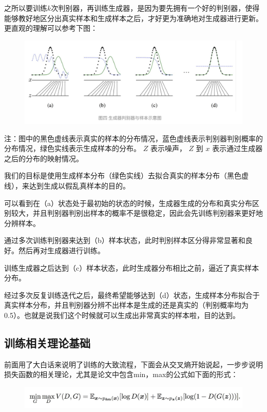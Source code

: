 \documentclass[12pt]{article}
\begin{document}
\begin{framed}
之所以要训练$k$次判别器，再训练生成器，是因为要先拥有一个好的判别器，使得能够教好地区分出真实样本和生成样本之后，才好更为准确地对生成器进行更新。更直观的理解可以参考下图：
\begin{figure}[H]
    \centering
    \includegraphics[width=1\textwidth]{fig/GAN_Generator_Discriminator_Example.png}
\end{figure}

注：图中的黑色虚线表示真实的样本的分布情况，蓝色虚线表示判别器判别概率的分布情况，绿色实线表示生成样本的分布。 $Z$ 表示噪声， $Z$ 到 $x$ 表示通过生成器之后的分布的映射情况。

我们的目标是使用生成样本分布（绿色实线）去拟合真实的样本分布（黑色虚线），来达到生成以假乱真样本的目的。

可以看到在（a）状态处于最初始的状态的时候，生成器生成的分布和真实分布区别较大，并且判别器判别出样本的概率不是很稳定，因此会先训练判别器来更好地分辨样本。

通过多次训练判别器来达到（b）样本状态，此时判别样本区分得非常显著和良好。然后再对生成器进行训练。

训练生成器之后达到（c）样本状态，此时生成器分布相比之前，逼近了真实样本分布。

经过多次反复训练迭代之后，最终希望能够达到（d）状态，生成样本分布拟合于真实样本分布，并且判别器分辨不出样本是生成的还是真实的（判别概率均为0.5）。也就是说我们这个时候就可以生成出非常真实的样本啦，目的达到。
\end{framed}



\subsection{训练相关理论基础}
前面用了大白话来说明了训练的大致流程，下面会从交叉熵开始说起，一步步说明损失函数的相关理论，尤其是论文中包含min，max的公式如下面的形式：
\begin{figure}[H]
    \centering
    \includegraphics[width=1\textwidth]{fig/GAN_Eq_Minmax.png}
\end{figure}
\end{document}
